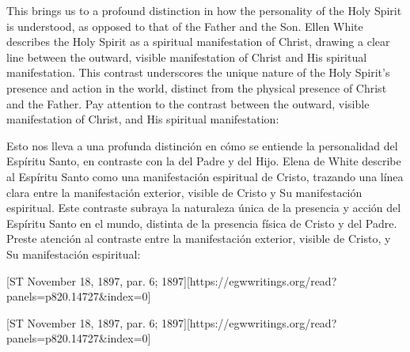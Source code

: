 This brings us to a profound distinction in how the personality of the Holy Spirit is understood, as opposed to that of the Father and the Son. Ellen White describes the Holy Spirit as a spiritual manifestation of Christ, drawing a clear line between the outward, visible manifestation of Christ and His spiritual manifestation. This contrast underscores the unique nature of the Holy Spirit's presence and action in the world, distinct from the physical presence of Christ and the Father. Pay attention to the contrast between the outward, visible manifestation of Christ, and His spiritual manifestation:


Esto nos lleva a una profunda distinción en cómo se entiende la personalidad del Espíritu Santo, en contraste con la del Padre y del Hijo. Elena de White describe al Espíritu Santo como una manifestación espiritual de Cristo, trazando una línea clara entre la manifestación exterior, visible de Cristo y Su manifestación espiritual. Este contraste subraya la naturaleza única de la presencia y acción del Espíritu Santo en el mundo, distinta de la presencia física de Cristo y del Padre. Preste atención al contraste entre la manifestación exterior, visible de Cristo, y Su manifestación espiritual:


[ST November 18, 1897, par. 6; 1897][https://egwwritings.org/read?panels=p820.14727&index=0]


[ST November 18, 1897, par. 6; 1897][https://egwwritings.org/read?panels=p820.14727&index=0]


